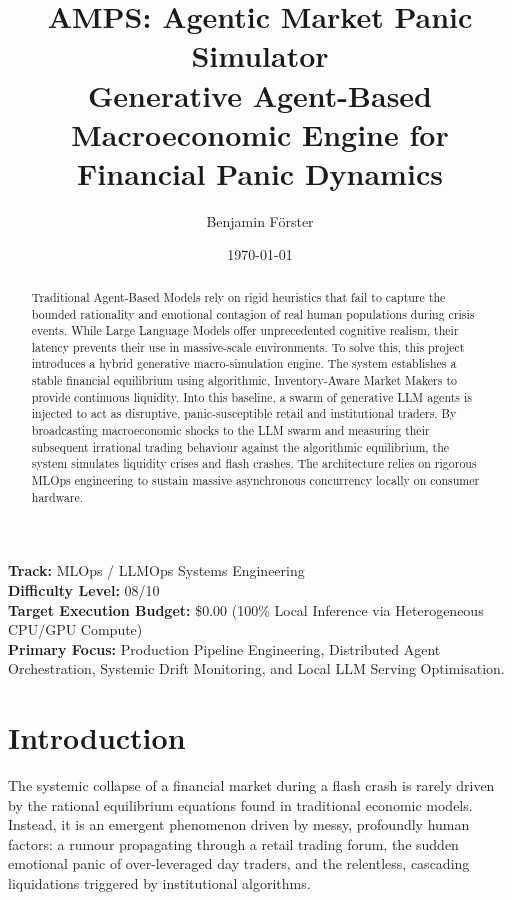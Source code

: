 \documentclass[10pt,a4paper]{article}
\title{\textbf{AMPS: Agentic Market Panic Simulator}\\[0.2cm] \Large Generative Agent-Based Macroeconomic Engine for Financial Panic Dynamics}
\author{Benjamin Förster}
\date{\today}
\begin{document}
\maketitle

\vspace{0.5cm}

\noindent \textbf{Track:} MLOps / LLMOps Systems Engineering \\
\textbf{Difficulty Level:} 08/10 \\
\textbf{Target Execution Budget:} \$0.00 (100\% Local Inference via Heterogeneous CPU/GPU Compute) \\
\textbf{Primary Focus:} Production Pipeline Engineering, Distributed Agent Orchestration, Systemic Drift Monitoring, and Local LLM Serving Optimisation.

\vspace{0.5cm}
\begin{abstract}
\noindent Traditional Agent-Based Models rely on rigid heuristics that fail to capture the bounded rationality and emotional contagion of real human populations during crisis events. While Large Language Models offer unprecedented cognitive realism, their latency prevents their use in massive-scale environments. To solve this, this project introduces a hybrid generative macro-simulation engine. The system establishes a stable financial equilibrium using algorithmic, Inventory-Aware Market Makers to provide continuous liquidity. Into this baseline, a swarm of generative LLM agents is injected to act as disruptive, panic-susceptible retail and institutional traders. By broadcasting macroeconomic shocks to the LLM swarm and measuring their subsequent irrational trading behaviour against the algorithmic equilibrium, the system simulates liquidity crises and flash crashes. The architecture relies on rigorous MLOps engineering to sustain massive asynchronous concurrency locally on consumer hardware.
\end{abstract}
\vspace{0.5cm}

\section{Introduction}

The systemic collapse of a financial market during a flash crash is rarely driven by the rational equilibrium equations found in traditional economic models. Instead, it is an emergent phenomenon driven by messy, profoundly human factors: a rumour propagating through a retail trading forum, the sudden emotional panic of over-leveraged day traders, and the relentless, cascading liquidations triggered by institutional algorithms.
\end{document}
